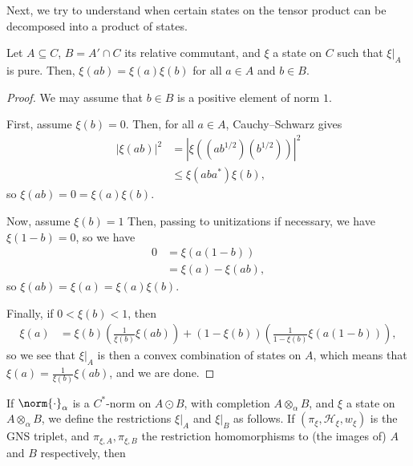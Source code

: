 \documentclass[10pt]{mypackage}
\begin{document}
Next, we try to understand when certain states on the tensor product can be decomposed into a product of states.
\begin{lemma}
  Let $A\subseteq C$, $B = A'\cap C$ its relative commutant, and $\xi$ a state on $C$ such that $\xi|_{A}$ is pure. Then, $\xi\left( ab \right) = \xi\left( a \right)\xi\left( b \right)$ for all $a\in A$ and $b\in B$.
\end{lemma}
\begin{proof}
  We may assume that $b\in B$ is a positive element of norm $1$.

  First, assume $\xi(b) = 0$. Then, for all $a\in A$, Cauchy--Schwarz gives
  \begin{align*}
    \left\vert \xi\left( ab \right) \right\vert^2 &= \left\vert \xi\left( \left( ab^{1/2} \right)\left( b^{1/2} \right) \right) \right\vert^2\\
                                                  &\leq \xi\left( aba^{\ast} \right)\xi\left( b \right),
  \end{align*}
  so $\xi\left( ab \right) = 0 = \xi\left( a \right)\xi\left( b \right)$.

  Now, assume $\xi(b) = 1$ Then, passing to unitizations if necessary, we have $\xi\left( 1-b \right) = 0$, so we have
  \begin{align*}
    0 &= \xi\left( a\left( 1-b \right) \right)\\
      &= \xi\left( a \right)-\xi\left( ab \right),
  \end{align*}
  so $\xi\left( ab \right) = \xi\left( a \right) = \xi\left( a \right)\xi\left( b \right)$.

  Finally, if $0 < \xi\left( b \right) < 1$, then
  \begin{align*}
    \xi\left( a \right) &= \xi\left( b \right)\left( \frac{1}{\xi\left( b \right)}\xi\left( ab \right) \right) + \left( 1-\xi\left( b \right) \right) \left( \frac{1}{1-\xi\left( b \right)}\xi\left( a\left( 1-b \right) \right) \right),
  \end{align*}
  so we see that $\xi|_{A}$ is then a convex combination of states on $A$, which means that $\xi\left( a \right) = \frac{1}{\xi\left( b \right)}\xi\left( ab \right)$, and we are done.
\end{proof}
If $\norm{\cdot}_{\alpha}$ is a $C^{\ast}$-norm on $A\odot B$, with completion $A\otimes_{\alpha}B$, and $\xi$ a state on $A\otimes_{\alpha}B$, we define the restrictions $\xi|_{A}$ and $\xi|_{B}$ as follows. If $\left( \pi_{\xi}, \mathcal{H}_{\xi},w_{\xi} \right)$ is the GNS triplet, and $\pi_{\xi,A},\pi_{\xi,B}$ the restriction homomorphisms to (the images of) $A$ and $B$ respectively, then
\end{document}
